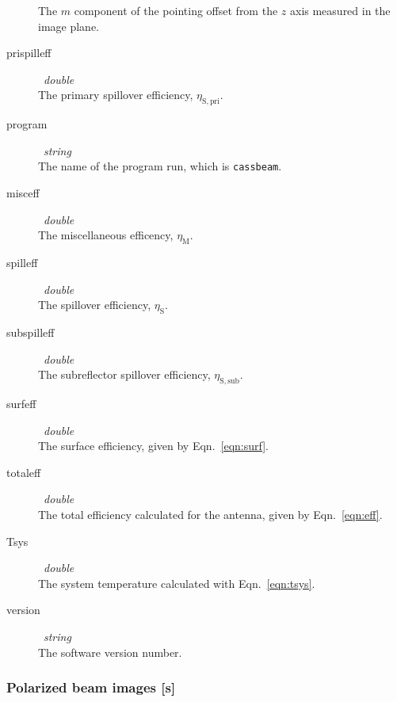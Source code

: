 \documentclass{article}
\begin{document}
\begin{description}
The $m$ component of the pointing offset from the $z$ axis 
measured in the image plane.
\item[prispilleff] \ {\it double} \\
The primary spillover efficiency, $\eta_\mathrm{S,pri}$.
\item[program] \ {\it string} \\
The name of the program run, which is {\tt cassbeam}.
\item[misceff] \ {\it double} \\
The miscellaneous efficency, $\eta_\mathrm{M}$.
\item[spilleff] \ {\it double} \\
The spillover efficiency, $\eta_\mathrm{S}$.
\item[subspilleff] \ {\it double} \\
The subreflector spillover efficiency, $\eta_\mathrm{S,sub}$.
\item[surfeff] \ {\it double} \\
The surface efficiency, given by Eqn.~\ref{eqn:surf}.
\item[totaleff] \ {\it double} \\
The total efficiency calculated for the antenna, given by 
Eqn.~\ref{eqn:eff}.
\item[Tsys] \ {\it double} \\
The system temperature calculated with Eqn.~\ref{eqn:tsys}.
\item[version] \ {\it string} \\
The software version number.
\end{description}

\subsubsection{Polarized beam images [{\bf s}]}
\end{document}
